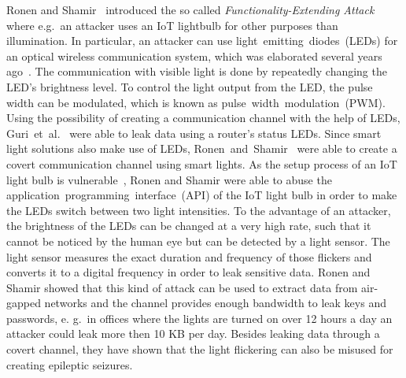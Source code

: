 Ronen and Shamir~\cite{Ronen:2016:EFAIDCSL} introduced the so called \textit{Functionality-Extending Attack} where e.g.\ an attacker uses an IoT lightbulb for other purposes than illumination.
In particular, an attacker can use light~emitting~diodes~(LEDs) for an optical wireless communication system, which was elaborated several years ago~\cite{Komine:2004:FAfVLCSuLL, Elgala:2007:OVLWCBoWL}. 
The communication with visible light is done by repeatedly changing the LED's brightness level. To control the light output from the LED, the pulse width can be modulated, which is known as pulse~width~modulation~(PWM).  
Using the possibility of creating a communication channel with the help of LEDs, Guri~et~al.~\cite{Guri:2017:xCDEANvRL} were able to leak data using a router's status LEDs.
Since smart light solutions also make use of LEDs, Ronen~and~Shamir~\cite{Ronen:2016:EFAIDCSL} were able to create a covert communication channel using smart lights.
As the setup process of an IoT light bulb is vulnerable~\cite{Dhanjani:2013:HLSEPHPWLS, Morgner:2016:AYBBUICSSCLS, Ronen:2018:IGNCZCR}, Ronen and Shamir were able to abuse the application~programming~interface~(API) of the IoT light bulb in order to make the LEDs switch between two light intensities. To the advantage of an attacker, the brightness of the LEDs can be changed at a very high rate, such that it cannot be noticed by the human eye but can be detected by a light sensor. 
The light sensor measures the exact duration and frequency of those flickers and converts it to a digital frequency in order to leak sensitive data.
Ronen and Shamir showed that this kind of attack can be used to extract data from air-gapped networks and the channel provides enough bandwidth to leak keys and passwords, e. g.\ in offices where the lights are turned on over 12 hours a day an attacker could leak more then 10 KB per day.
Besides leaking data through a covert channel, they have shown that the light flickering can also be misused for creating epileptic seizures.